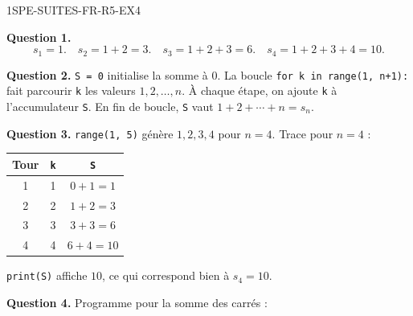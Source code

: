\begin{corrige}{1SPE-SUITES-FR-R5-EX4}

\textbf{Question 1.}
\[
s_1 = 1. \quad s_2 = 1+2 = 3. \quad s_3 = 1+2+3 = 6. \quad s_4 = 1+2+3+4 = 10.
\]


\textbf{Question 2.} \verb|S = 0| initialise la somme à $0$. La boucle \verb|for k in range(1, n+1):| fait parcourir \verb|k| les valeurs $1, 2, \ldots, n$. À chaque étape, on ajoute \verb|k| à l'accumulateur \verb|S|. En fin de boucle, \verb|S| vaut $1 + 2 + \cdots + n = s_n$.

\textbf{Question 3.} \verb|range(1, 5)| génère $1, 2, 3, 4$ pour $n = 4$. Trace pour $n = 4$ :

\begin{center}
\begin{tabular}{|c|c|c|}
\hline
Tour & \verb|k| & \verb|S| \\
\hline
1 & 1 & $0+1=1$ \\
2 & 2 & $1+2=3$ \\
3 & 3 & $3+3=6$ \\
4 & 4 & $6+4=10$ \\
\hline
\end{tabular}
\end{center}

\verb|print(S)| affiche $10$, ce qui correspond bien à $s_4 = 10$. \checkmark


\textbf{Question 4.} Programme pour la somme des carrés :

\medskip


\end{corrige}
